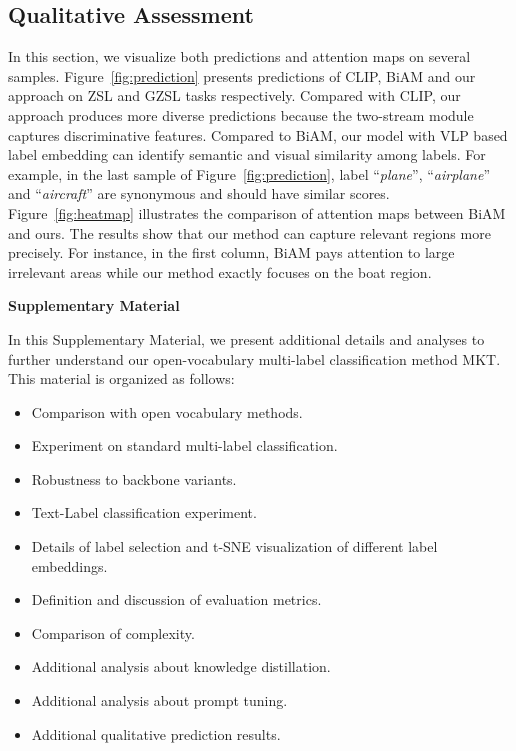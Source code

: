 \documentclass[letterpaper]{article} %
\begin{document}
\subsection{Qualitative Assessment}
In this section, we visualize both predictions and attention maps on several samples.
Figure~\ref{fig:prediction} presents predictions of CLIP, BiAM and our approach on ZSL and GZSL tasks respectively. 
Compared with CLIP, our approach produces more diverse predictions because the two-stream module captures discriminative features. 
Compared to BiAM, our model with VLP based label embedding can identify semantic and visual similarity among labels.  
For example, in the last sample of Figure~\ref{fig:prediction},  label ``\textit{plane}'', ``\textit{airplane}'' and ``\textit{aircraft}'' are synonymous and should have similar scores.
Figure~\ref{fig:heatmap} illustrates the comparison of attention maps between BiAM and ours. 
The results show that our method can capture relevant regions more precisely. 
For instance, in the first column, BiAM pays attention to large irrelevant areas while our method exactly focuses on the boat region.





\clearpage
\appendix
\begin{center} \begin{Large}{\textbf{Supplementary Material}} \end{Large} 
\vspace{10pt}
\end{center}
In this Supplementary Material, we present additional details and analyses to further understand our open-vocabulary multi-label classification method MKT.
This material is organized as follows:
\begin{itemize}
    \item Comparison with open vocabulary methods.
    \item Experiment on standard multi-label classification.
    \item Robustness to backbone variants.
    \item Text-Label classification experiment.
    \item Details of label selection and t-SNE visualization of different label embeddings.
    \item Definition and discussion of evaluation metrics. 
    \item Comparison of complexity. 
    \item Additional analysis about knowledge distillation. 
    \item Additional analysis about prompt tuning.
    \item Additional qualitative prediction results. 
\end{itemize}
\end{document}
